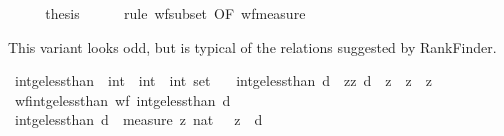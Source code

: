 \begin{isabellebody}
\ \ \isamarkupfalse%
\ \isamarkupfalse%
\ {\isacharquery}{\kern0pt}thesis\isanewline
\ \ \ \ \isamarkupfalse%
\ {\isacharparenleft}{\kern0pt}rule\ wf{\isacharunderscore}{\kern0pt}subset\ {\isacharbrackleft}{\kern0pt}OF\ wf{\isacharunderscore}{\kern0pt}measure{\isacharbrackright}{\kern0pt}{\isacharparenright}{\kern0pt}\isanewline
{}\isamarkupfalse%
%
\endisatagproof
{\isafoldproof}%
%
\isadelimproof
%
\endisadelimproof
%
\begin{isamarkuptext}%
This variant looks odd, but is typical of the relations suggested
  by RankFinder.%
\end{isamarkuptext}\isamarkuptrue%
\isamarkupfalse%
\ int{\isacharunderscore}{\kern0pt}ge{\isacharunderscore}{\kern0pt}less{\isacharunderscore}{\kern0pt}than{}\ {\isacharcolon}{\kern0pt}{\isacharcolon}{\kern0pt}\ {\isachardoublequoteopen}int\ {\isasymRightarrow}\ {\isacharparenleft}{\kern0pt}int\ {\isasymtimes}\ int{\isacharparenright}{\kern0pt}\ set{\isachardoublequoteclose}\isanewline
\ \ \ {\isachardoublequoteopen}int{\isacharunderscore}{\kern0pt}ge{\isacharunderscore}{\kern0pt}less{\isacharunderscore}{\kern0pt}than{}\ d\ {\isacharequal}{\kern0pt}\ {\isacharbraceleft}{\kern0pt}{\isacharparenleft}{\kern0pt}z{\isacharprime}{\kern0pt}{\isacharcomma}{\kern0pt}z{\isacharparenright}{\kern0pt}{\isachardot}{\kern0pt}\ d\ {\isasymle}\ z\ {\isasymand}\ z{\isacharprime}{\kern0pt}\ {\isacharless}{\kern0pt}\ z{\isacharbraceright}{\kern0pt}{\isachardoublequoteclose}\isanewline
\isanewline
{}\isamarkupfalse%
\ wf{\isacharunderscore}{\kern0pt}int{\isacharunderscore}{\kern0pt}ge{\isacharunderscore}{\kern0pt}less{\isacharunderscore}{\kern0pt}than{}{\isacharcolon}{\kern0pt}\ {\isachardoublequoteopen}wf\ {\isacharparenleft}{\kern0pt}int{\isacharunderscore}{\kern0pt}ge{\isacharunderscore}{\kern0pt}less{\isacharunderscore}{\kern0pt}than{}\ d{\isacharparenright}{\kern0pt}{\isachardoublequoteclose}\isanewline
%
\isadelimproof
%
\endisadelimproof
%
\isatagproof
{}\isamarkupfalse%
\ {\isacharminus}{\kern0pt}\isanewline
\ \ \isamarkupfalse%
\ {\isachardoublequoteopen}int{\isacharunderscore}{\kern0pt}ge{\isacharunderscore}{\kern0pt}less{\isacharunderscore}{\kern0pt}than{}\ d\ {\isasymsubseteq}\ measure\ {\isacharparenleft}{\kern0pt}{\isasymlambda}z{\isachardot}{\kern0pt}\ nat\ {\isacharparenleft}{\kern0pt}{}\ {\isacharplus}{\kern0pt}\ z\ {\isacharminus}{\kern0pt}\ d{\isacharparenright}{\kern0pt}{\isacharparenright}{\kern0pt}{\isachardoublequoteclose}\isanewline

\end{isabellebody}
